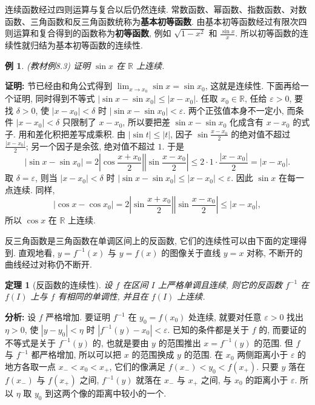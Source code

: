 \documentclass[UTF8,openany]{ctexbook}
\theoremstyle{chinesetextbook}
\newtheorem{example}{例}[section]
\newtheorem{theorem}{定理}[section]
\newenvironment{cnproof}{\par\indent\textbf{证明:} \ignorespaces}{\par}
\begin{document}
连续函数经过四则运算与复合以后仍然连续. 常数函数、幂函数、指数函数、对数函数、三角函数和反三角函数统称为\textbf{基本初等函数}. 由基本初等函数经过有限次四则运算和复合得到的函数称为\textbf{初等函数}, 例如 $\sqrt{1-x^2}$ 和 $\displaystyle\frac{\sin x}x$. 所以初等函数的连续性就归结为基本初等函数的连续性.
\begin{example}\label{ex:8-3}
\textnormal{(教材例8.3)} 证明 $\sin x$ 在 $\mathbb R$ 上连续.
\end{example}
\begin{cnproof}
1.6 节已经由和角公式得到 $\displaystyle\lim_{x\to x_0}\sin x=\sin x_0$, 这就是连续性. 下面再给一个证明, 同时得到不等式 $|\sin x-\sin x_0|\le|x-x_0|$. 任取 $x_0\in\mathbb R$, 任给 $\varepsilon>0$, 要找 $\delta>0$, 使 $|x-x_0|<\delta$ 时 $|\sin x-\sin x_0|<\varepsilon$. 两个正弦值本身不一定小, 而条件 $|x-x_0|<\delta$ 只限制了 $x-x_0$, 所以要把差 $\sin x-\sin x_0$ 化成含有 $x-x_0$ 的式子. 用和差化积把差写成乘积. 由 $|\sin t|\le|t|$, 因子 $\displaystyle\sin\frac{x-x_0}2$ 的绝对值不超过 $\displaystyle\frac{|x-x_0|}2$; 另一个因子是余弦, 绝对值不超过 $1$. 于是
\[
|\sin x-\sin x_0|=2\left|\cos\frac{x+x_0}2\right|\left|\sin\frac{x-x_0}2\right|\le2\cdot1\cdot\frac{|x-x_0|}2=|x-x_0|.
\]
取 $\delta=\varepsilon$, 则当 $|x-x_0|<\delta$ 时 $|\sin x-\sin x_0|\le|x-x_0|<\varepsilon$. 因此 $\sin x$ 在每一点连续. 同样,
\[
|\cos x-\cos x_0|=2\left|\sin\frac{x+x_0}2\right|\left|\sin\frac{x-x_0}2\right|\le|x-x_0|,
\]
所以 $\cos x$ 在 $\mathbb R$ 上连续.
\end{cnproof}
反三角函数是三角函数在单调区间上的反函数, 它们的连续性可以由下面的定理得到. 直观地看, $y=f^{-1}(x)$ 与 $y=f(x)$ 的图像关于直线 $y=x$ 对称, 不断开的曲线经过对称仍不断开.
\begin{theorem}[反函数的连续性]
设 $f$ 在区间 $I$ 上严格单调且连续, 则它的反函数 $f^{-1}$ 在 $f(I)$ 上与 $f$ 有相同的单调性, 并且在 $f(I)$ 上连续.
\end{theorem}
\par\indent\textbf{分析:} 设 $f$ 严格增加. 要证明 $f^{-1}$ 在 $y_0=f(x_0)$ 处连续, 就要对任意 $\varepsilon>0$ 找出 $\eta>0$, 使 $|y-y_0|<\eta$ 时 $|f^{-1}(y)-x_0|<\varepsilon$. 已知的条件都是关于 $f$ 的, 而要证的不等式是关于 $f^{-1}(y)$ 的, 也就是要由 $y$ 的范围推出 $x=f^{-1}(y)$ 的范围. 但 $f$ 与 $f^{-1}$ 都严格增加, 所以可以把 $x$ 的范围换成 $y$ 的范围. 在 $x_0$ 两侧距离小于 $\varepsilon$ 的地方各取一点 $x_-<x_0<x_+$, 它们的像满足 $f(x_-)<y_0<f(x_+)$. 只要 $y$ 落在 $f(x_-)$ 与 $f(x_+)$ 之间, $f^{-1}(y)$ 就落在 $x_-$ 与 $x_+$ 之间, 与 $x_0$ 的距离小于 $\varepsilon$. 所以 $\eta$ 取 $y_0$ 到这两个像的距离中较小的一个.
\end{document}
